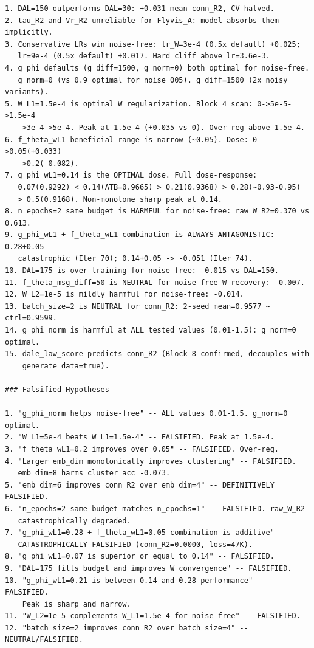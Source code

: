 \documentclass{article}
\begin{document}
\begin{tiny}
\begin{verbatim}
1. DAL=150 outperforms DAL=30: +0.031 mean conn_R2, CV halved.
2. tau_R2 and Vr_R2 unreliable for Flyvis_A: model absorbs them implicitly.
3. Conservative LRs win noise-free: lr_W=3e-4 (0.5x default) +0.025;
   lr=9e-4 (0.5x default) +0.017. Hard cliff above lr=3.6e-3.
4. g_phi defaults (g_diff=1500, g_norm=0) both optimal for noise-free.
   g_norm=0 (vs 0.9 optimal for noise_005). g_diff=1500 (2x noisy variants).
5. W_L1=1.5e-4 is optimal W regularization. Block 4 scan: 0->5e-5->1.5e-4
   ->3e-4->5e-4. Peak at 1.5e-4 (+0.035 vs 0). Over-reg above 1.5e-4.
6. f_theta_wL1 beneficial range is narrow (~0.05). Dose: 0->0.05(+0.033)
   ->0.2(-0.082).
7. g_phi_wL1=0.14 is the OPTIMAL dose. Full dose-response:
   0.07(0.9292) < 0.14(ATB=0.9665) > 0.21(0.9368) > 0.28(~0.93-0.95)
   > 0.5(0.9168). Non-monotone sharp peak at 0.14.
8. n_epochs=2 same budget is HARMFUL for noise-free: raw_W_R2=0.370 vs 0.613.
9. g_phi_wL1 + f_theta_wL1 combination is ALWAYS ANTAGONISTIC: 0.28+0.05
   catastrophic (Iter 70); 0.14+0.05 -> -0.051 (Iter 74).
10. DAL=175 is over-training for noise-free: -0.015 vs DAL=150.
11. f_theta_msg_diff=50 is NEUTRAL for noise-free W recovery: -0.007.
12. W_L2=1e-5 is mildly harmful for noise-free: -0.014.
13. batch_size=2 is NEUTRAL for conn_R2: 2-seed mean=0.9577 ~ ctrl=0.9599.
14. g_phi_norm is harmful at ALL tested values (0.01-1.5): g_norm=0 optimal.
15. dale_law_score predicts conn_R2 (Block 8 confirmed, decouples with
    generate_data=true).

### Falsified Hypotheses

1. "g_phi_norm helps noise-free" -- ALL values 0.01-1.5. g_norm=0 optimal.
2. "W_L1=5e-4 beats W_L1=1.5e-4" -- FALSIFIED. Peak at 1.5e-4.
3. "f_theta_wL1=0.2 improves over 0.05" -- FALSIFIED. Over-reg.
4. "Larger emb_dim monotonically improves clustering" -- FALSIFIED.
   emb_dim=8 harms cluster_acc -0.073.
5. "emb_dim=6 improves conn_R2 over emb_dim=4" -- DEFINITIVELY FALSIFIED.
6. "n_epochs=2 same budget matches n_epochs=1" -- FALSIFIED. raw_W_R2
   catastrophically degraded.
7. "g_phi_wL1=0.28 + f_theta_wL1=0.05 combination is additive" --
   CATASTROPHICALLY FALSIFIED (conn_R2=0.0000, loss=47K).
8. "g_phi_wL1=0.07 is superior or equal to 0.14" -- FALSIFIED.
9. "DAL=175 fills budget and improves W convergence" -- FALSIFIED.
10. "g_phi_wL1=0.21 is between 0.14 and 0.28 performance" -- FALSIFIED.
    Peak is sharp and narrow.
11. "W_L2=1e-5 complements W_L1=1.5e-4 for noise-free" -- FALSIFIED.
12. "batch_size=2 improves conn_R2 over batch_size=4" -- NEUTRAL/FALSIFIED.


\end{verbatim}
\end{tiny}
\end{document}
